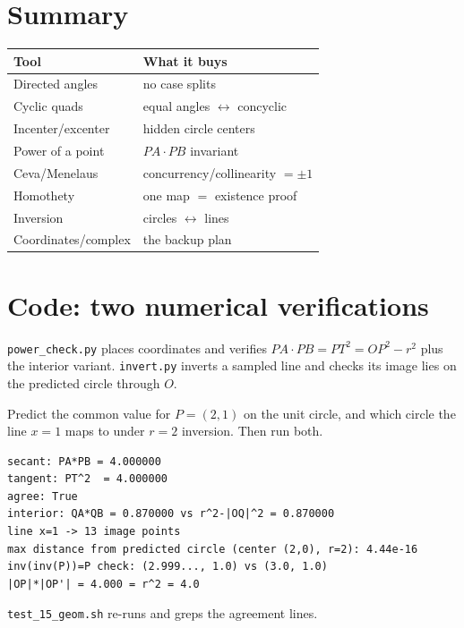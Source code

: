 \section{Summary}
\begin{center}\small
\begin{tabular}{@{}ll@{}}
\toprule
\textbf{Tool} & \textbf{What it buys} \\
\midrule
Directed angles & no case splits \\
Cyclic quads & equal angles $\leftrightarrow$ concyclic \\
Incenter/excenter & hidden circle centers \\
Power of a point & $PA\cdot PB$ invariant \\
Ceva/Menelaus & concurrency/collinearity $=\pm1$ \\
Homothety & one map $=$ existence proof \\
Inversion & circles $\leftrightarrow$ lines \\
Coordinates/complex & the backup plan \\
\bottomrule
\end{tabular}
\end{center}

\section{Code: two numerical verifications}
\texttt{power\_check.py} places coordinates and verifies
$PA\cdot PB = PT^2 = OP^2-r^2$ plus the interior variant.
\texttt{invert.py} inverts a sampled line and checks its image lies on
the predicted circle through $O$.
\begin{checkpoint}
Predict the common value for $P=(2,1)$ on the unit circle, and which
circle the line $x=1$ maps to under $r=2$ inversion. Then run both.
\end{checkpoint}
\begin{lstlisting}
secant: PA*PB = 4.000000
tangent: PT^2  = 4.000000
agree: True
interior: QA*QB = 0.870000 vs r^2-|OQ|^2 = 0.870000
line x=1 -> 13 image points
max distance from predicted circle (center (2,0), r=2): 4.44e-16
inv(inv(P))=P check: (2.999..., 1.0) vs (3.0, 1.0)
|OP|*|OP'| = 4.000 = r^2 = 4.0
\end{lstlisting}
\texttt{test\_15\_geom.sh} re-runs and greps the agreement lines.

